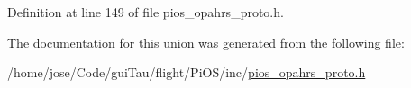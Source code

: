 Definition at line 149 of file pios\-\_\-opahrs\-\_\-proto.\-h.



The documentation for this union was generated from the following file\-:\begin{DoxyCompactItemize}
\item 
/home/jose/\-Code/gui\-Tau/flight/\-Pi\-O\-S/inc/\hyperlink{pios__opahrs__proto_8h}{pios\-\_\-opahrs\-\_\-proto.\-h}\end{DoxyCompactItemize}
